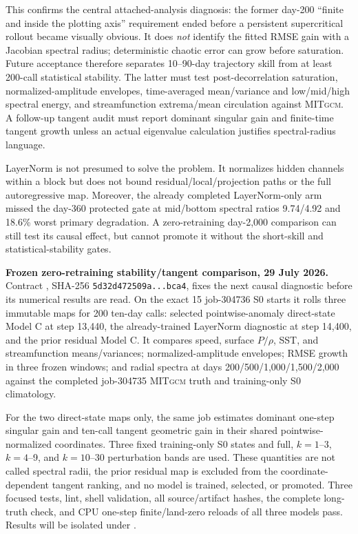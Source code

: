 \documentclass[11pt]{article}
\newcommand{\MITgcm}{\textsc{MITgcm}}
\begin{document}
This confirms the central attached-analysis diagnosis: the former day-200
``finite and inside the plotting axis'' requirement ended before a persistent
supercritical rollout became visually obvious.  It does \emph{not} identify
the fitted RMSE gain with a Jacobian spectral radius; deterministic chaotic
error can grow before saturation.  Future acceptance therefore separates
10--90-day trajectory skill from at least 200-call statistical stability.
The latter must test post-decorrelation saturation, normalized-amplitude
envelopes, time-averaged mean/variance and low/mid/high spectral energy,
and streamfunction extrema/mean circulation against \MITgcm{}.  A follow-up
tangent audit must report dominant singular gain and finite-time tangent
growth unless an actual eigenvalue calculation justifies spectral-radius
language.

LayerNorm is not presumed to solve the problem.  It normalizes hidden
channels within a block but does not bound residual/local/projection paths or
the full autoregressive map.  Moreover, the already completed LayerNorm-only
arm missed the day-360 protected gate at mid/bottom spectral ratios
9.74/4.92 and 18.6\% worst primary degradation.  A zero-retraining
day-2,000 comparison can still test its causal effect, but cannot promote it
without the short-skill and statistical-stability gates.

\textbf{Frozen zero-retraining stability/tangent comparison, 29 July 2026.}
Contract ,
SHA-256 \texttt{5d32d472509a...bca4}, fixes the next causal diagnostic before
its numerical results are read.  On the exact 15 job-304736 S0 starts it
rolls three immutable maps for 200 ten-day calls: selected pointwise-anomaly
direct-state Model C at step 13,440, the already-trained LayerNorm diagnostic
at step 14,400, and the prior residual Model C.  It compares speed, surface
\(P/\rho\), SST, and streamfunction means/variances; normalized-amplitude
envelopes; RMSE growth in three frozen windows; and radial spectra at days
200/500/1,000/1,500/2,000 against the completed job-304735 \MITgcm{} truth
and training-only S0 climatology.

For the two direct-state maps only, the same job estimates dominant
one-step singular gain and ten-call tangent geometric gain in their shared
pointwise-normalized coordinates.  Three fixed training-only S0 states and
full, \(k=1\)--3, \(k=4\)--9, and \(k=10\)--30 perturbation bands are used.
These quantities are not called spectral radii, the prior residual map is
excluded from the coordinate-dependent tangent ranking, and no model is
trained, selected, or promoted.  Three focused tests, lint, shell validation,
all source/artifact hashes, the complete long-truth check, and CPU one-step
finite/land-zero reloads of all three models pass.  Results will be isolated
under
.
\end{document}

